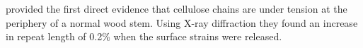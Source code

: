\cite{Clair_2006} provided the first direct evidence that cellulose chains are under tension at the periphery of a normal wood stem. Using X-ray diffraction they found an increase in repeat length of 0.2\% when the surface strains were released. 